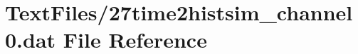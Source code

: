 \hypertarget{27time2histsim__channel0_8dat}{}\section{Text\+Files/27time2histsim\+\_\+channel0.dat File Reference}
\label{27time2histsim__channel0_8dat}
